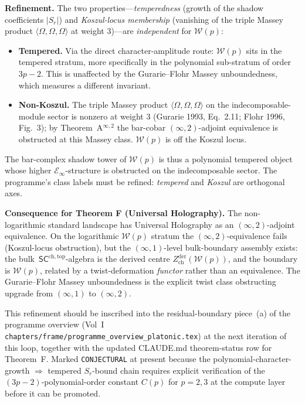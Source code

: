 \documentclass[11pt]{article}
\newcommand{\cW}{\mathcal{W}}
\newcommand{\cE}{\mathcal{E}}
\newcommand{\SCchtop}{\mathsf{SC}^{\mathrm{ch,top}}}
\begin{document}
\textbf{Refinement.} The two properties---\emph{temperedness}
(growth of the shadow coefficients $|S_r|$) and
\emph{Koszul-locus membership} (vanishing of the triple Massey
product $\langle\Omega,\Omega,\Omega\rangle$ at weight $3$)---are
\emph{independent} for $\cW(p)$:
\begin{itemize}
  \item \textbf{Tempered.} Via the direct character-amplitude
        route: $\cW(p)$ sits in the tempered stratum, more
        specifically in the polynomial sub-stratum of order
        $3p-2$. This is unaffected by the Gurarie--Flohr Massey
        unboundedness, which measures a different invariant.
  \item \textbf{Non-Koszul.} The triple Massey product
        $\langle\Omega,\Omega,\Omega\rangle$ on the
        indecomposable-module sector is nonzero at weight $3$
        (Gurarie 1993, Eq.\ 2.11; Flohr 1996, Fig.\ 3);
        by Theorem~A$^{\infty,2}$ the bar-cobar $(\infty,2)$-adjoint
        equivalence is obstructed at this Massey class. $\cW(p)$
        is off the Koszul locus.
\end{itemize}
The bar-complex shadow tower of $\cW(p)$ is thus a polynomial
tempered object whose higher $\cE_\infty$-structure is
obstructed on the indecomposable sector. The programme's class
labels must be refined: \emph{tempered} and \emph{Koszul} are
orthogonal axes.

\textbf{Consequence for Theorem F (Universal Holography).}
The non-logarithmic standard landscape has Universal Holography
as an $(\infty,2)$-adjoint equivalence. On the logarithmic
$\cW(p)$ stratum the $(\infty,2)$-equivalence fails
(Koszul-locus obstruction), but the $(\infty,1)$-level bulk-boundary
assembly exists: the bulk~$\SCchtop$-algebra is the
derived centre $Z^{\mathrm{der}}_{\mathrm{ch}}(\cW(p))$, and the
boundary is $\cW(p)$, related by a twist-deformation
\emph{functor} rather than an equivalence. The Gurarie--Flohr
Massey unboundedness is the explicit twist class obstructing
upgrade from $(\infty,1)$ to $(\infty,2)$.

This refinement should be inscribed into the residual-boundary
piece~(a) of the programme overview (Vol~I
\verb|chapters/frame/programme_overview_platonic.tex|) at the
next iteration of this loop, together with the updated CLAUDE.md
theorem-status row for Theorem~F. Marked \texttt{CONJECTURAL} at
present because the polynomial-character-growth $\Rightarrow$
tempered $S_r$-bound chain requires explicit verification of
the $(3p-2)$-polynomial-order constant $C(p)$ for $p = 2, 3$ at
the compute layer before it can be promoted.
\end{document}
